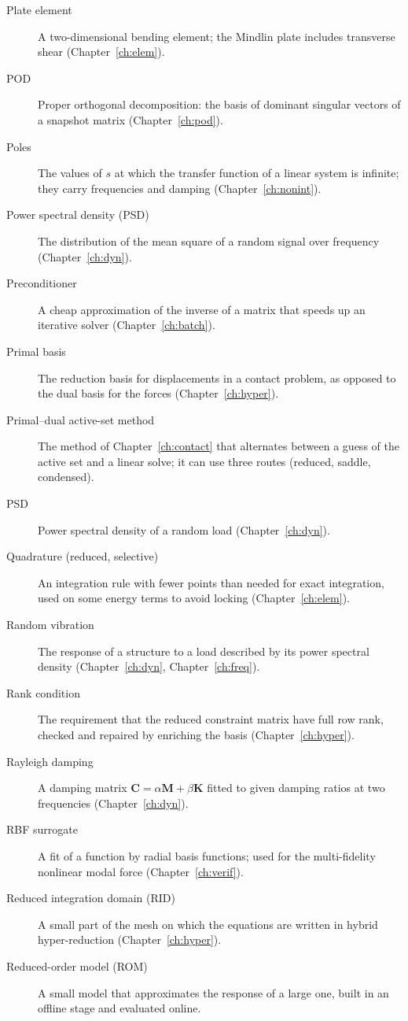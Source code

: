 \begin{description}
\item[Plate element] A two-dimensional bending element; the Mindlin plate includes transverse shear (Chapter~\ref{ch:elem}).
\item[POD] Proper orthogonal decomposition: the basis of dominant singular vectors of a snapshot matrix (Chapter~\ref{ch:pod}).
\item[Poles] The values of $s$ at which the transfer function of a linear system is infinite; they carry frequencies and damping (Chapter~\ref{ch:nonint}).
\item[Power spectral density (PSD)] The distribution of the mean square of a random signal over frequency (Chapter~\ref{ch:dyn}).
\item[Preconditioner] A cheap approximation of the inverse of a matrix that speeds up an iterative solver (Chapter~\ref{ch:batch}).
\item[Primal basis] The reduction basis for displacements in a contact problem, as opposed to the dual basis for the forces (Chapter~\ref{ch:hyper}).
\item[Primal--dual active-set method] The method of Chapter~\ref{ch:contact} that alternates between a guess of the active set and a linear solve; it can use three routes (reduced, saddle, condensed).
\item[PSD] Power spectral density of a random load (Chapter~\ref{ch:dyn}).
\item[Quadrature (reduced, selective)] An integration rule with fewer points than needed for exact integration, used on some energy terms to avoid locking (Chapter~\ref{ch:elem}).
\item[Random vibration] The response of a structure to a load described by its power spectral density (Chapter~\ref{ch:dyn}, Chapter~\ref{ch:freq}).
\item[Rank condition] The requirement that the reduced constraint matrix have full row rank, checked and repaired by enriching the basis (Chapter~\ref{ch:hyper}).
\item[Rayleigh damping] A damping matrix $\bm C=\alpha\bm M+\beta\bm K$ fitted to given damping ratios at two frequencies (Chapter~\ref{ch:dyn}).
\item[RBF surrogate] A fit of a function by radial basis functions; used for the multi-fidelity nonlinear modal force (Chapter~\ref{ch:verif}).
\item[Reduced integration domain (RID)] A small part of the mesh on which the equations are written in hybrid hyper-reduction (Chapter~\ref{ch:hyper}).
\item[Reduced-order model (ROM)] A small model that approximates the response of a large one, built in an offline stage and evaluated online.

\end{description}

